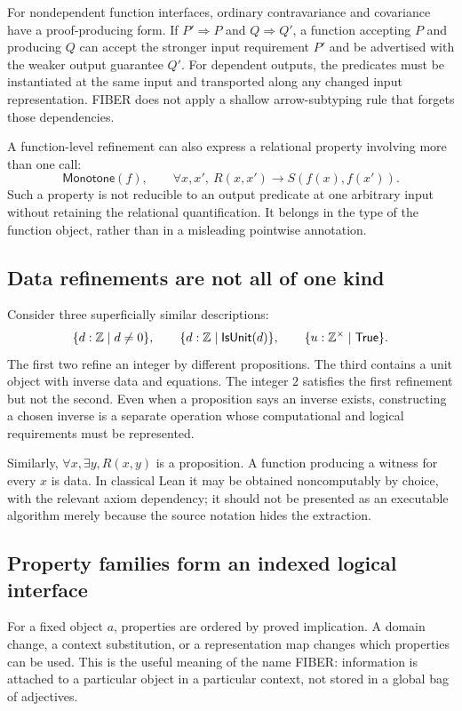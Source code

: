\documentclass[11pt,letterpaper]{article}
\theoremstyle{definition}\newtheorem{definition}[theorem]{Definition}
\begin{document}
For nondependent function interfaces, ordinary contravariance and covariance have a proof-producing form. If $P'\Rightarrow P$ and $Q\Rightarrow Q'$, a function accepting $P$ and producing $Q$ can accept the stronger input requirement $P'$ and be advertised with the weaker output guarantee $Q'$. For dependent outputs, the predicates must be instantiated at the same input and transported along any changed input representation. FIBER does not apply a shallow arrow-subtyping rule that forgets those dependencies.

A function-level refinement can also express a relational property involving more than one call:
\[
 \mathsf{Monotone}(f),\qquad
 \forall x,x',\ R(x,x')\to S(f(x),f(x')).
\]
Such a property is not reducible to an output predicate at one arbitrary input without retaining the relational quantification. It belongs in the type of the function object, rather than in a misleading pointwise annotation.

\subsection{Data refinements are not all of one kind}
Consider three superficially similar descriptions:
\[
 \{d:\mathbb Z\mid d\ne0\},\qquad
 \{d:\mathbb Z\mid \mathsf{IsUnit}(d)\},\qquad
 \{u:\mathbb Z^{\times}\mid \mathsf{True}\}.
\]
The first two refine an integer by different propositions. The third contains a unit object with inverse data and equations. The integer $2$ satisfies the first refinement but not the second. Even when a proposition says an inverse exists, constructing a chosen inverse is a separate operation whose computational and logical requirements must be represented.

Similarly, $\forall x,\exists y,R(x,y)$ is a proposition. A function producing a witness for every $x$ is data. In classical Lean it may be obtained noncomputably by choice, with the relevant axiom dependency; it should not be presented as an executable algorithm merely because the source notation hides the extraction.

\subsection{Property families form an indexed logical interface}
For a fixed object $a$, properties are ordered by proved implication. A domain change, a context substitution, or a representation map changes which properties can be used. This is the useful meaning of the name FIBER: information is attached to a particular object in a particular context, not stored in a global bag of adjectives.
\end{document}
